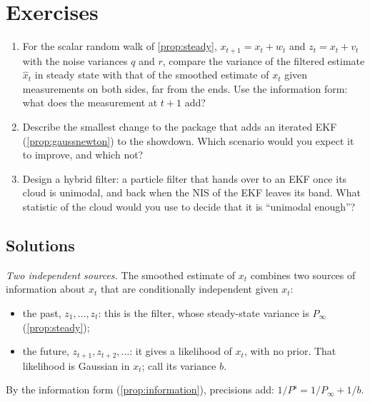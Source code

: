 \FloatBarrier
\section*{Exercises}

\begin{enumerate}[label=\textbf{7.\arabic*},ref=7.\arabic*]
\item\label{ex:smoothvar} For the scalar random walk of \cref{prop:steady}, $x_{t+1}=x_t+w_t$ and
$z_t=x_t+v_t$ with the noise variances $q$ and $r$, compare the variance of the filtered estimate
  $\hat x_t$ in steady state with that of the smoothed estimate of
  $x_t$ given measurements on both sides, far from the ends. Use the
  information form: what does the measurement at $t+1$ add?
\item\label{ex:addfilter} Describe the smallest change to the package
  that adds an iterated EKF (\cref{prop:gaussnewton}) to the showdown.
  Which scenario would you expect it to improve, and which not?
\item\label{ex:hybrid} Design a hybrid filter: a particle filter that
  hands over to an EKF once its cloud is unimodal, and back when the NIS
  of the EKF leaves its band. What statistic of the cloud would you use to
  decide that it is ``unimodal enough''?
\end{enumerate}

\subsection*{Solutions}

 \emph{Two independent sources.} The smoothed estimate of
$x_t$ combines two sources of information about $x_t$ that are
conditionally independent given $x_t$:
\begin{itemize}[nosep]
  \item the past, $z_1,\dots,z_t$: this is the filter, whose steady-state
        variance is $P_\infty$ (\cref{prop:steady});
  \item the future, $z_{t+1},z_{t+2},\dots$: it gives a likelihood of
        $x_t$, with no prior. That likelihood is Gaussian in $x_t$; call
        its variance $b$.
\end{itemize}
By the information form (\cref{prop:information}), precisions add:
$1/P^{\mathrm s}=1/P_\infty+1/b$.

